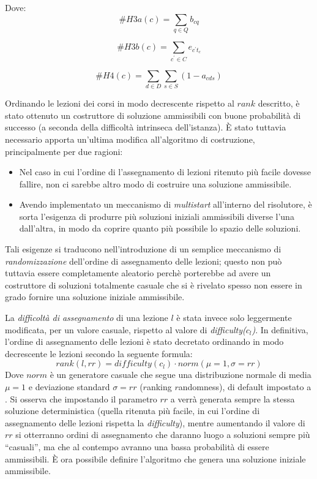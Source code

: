 \documentclass[]{article}
\newcommand{\q}[1]{``#1''}
\newcommand{\E}{È }
\begin{document}
Dove:
\[\#{H3a}(c) = \sum_{q \in Q} b_{cq}\]
\begin{center}
\end{center}

\[\#{H3b}(c) = \sum_{c^\prime \in C} e_{c^\prime t_{c}}\]
\begin{center}
\end{center}

\[\#{H4}(c) = \sum_{d \in D} \sum_{s \in S} (1 -a_{cds})\]
\begin{center}
\end{center}

Ordinando le lezioni dei corsi in modo decrescente rispetto al $rank$ descritto, è stato ottenuto un costruttore di soluzione ammissibili con buone probabilità di successo (a seconda della difficoltà intrinseca dell'istanza).
\E stato tuttavia necessario apporta un'ultima modifica all'algoritmo di costruzione, principalmente per due ragioni:
\begin{itemize}
	\item Nel caso in cui l'ordine di l'assegnamento di lezioni ritenuto più facile dovesse fallire, non ci sarebbe altro modo di costruire una soluzione ammissibile.
	\item Avendo implementato un meccanismo di \textit{multistart} all'interno del risolutore, è sorta l'esigenza di produrre più soluzioni iniziali ammissibili diverse l'una dall'altra, in modo da coprire quanto più possibile lo spazio delle soluzioni.
\end{itemize}
Tali esigenze si traducono nell'introduzione di un semplice meccanismo di \textit{randomizzazione} dell'ordine di assegnamento delle lezioni; questo non può tuttavia essere completamente aleatorio  perchè porterebbe ad avere un costruttore di soluzioni totalmente casuale che si è rivelato spesso non essere in grado fornire una soluzione iniziale ammissibile.

La \textit{difficoltà di assegnamento} di una lezione $l$ è stata invece solo leggermente modificata, per un valore casuale, rispetto al valore di \textit{difficulty($c_l$)}.
In definitiva, l'ordine di assegnamento delle lezioni è stato decretato ordinando in modo decrescente le lezioni secondo la seguente formula:
\[ \mathit{rank}(l,rr) = \mathit{difficulty}(c_l) \cdot \mathit{norm}(\mu=1, \sigma=rr) \]
Dove $norm$ è un generatore casuale che segue una distribuzione normale di media $\mu=1$ e deviazione standard $\sigma=rr$ ($r$anking $r$andomness), di default impostato a .
Si osserva che impostando il parametro $rr$ a  verrà generata sempre la stessa soluzione deterministica (quella ritenuta più facile, in cui l'ordine di assegnamento delle lezioni rispetta la \textit{difficulty}), mentre aumentando il valore di $rr$ si otterranno ordini di assegnamento che daranno luogo a soluzioni sempre più \q{casuali}, ma che al contempo avranno una bassa probabilità di essere ammissibili. \E ora possibile definire l'algoritmo che genera una soluzione iniziale ammissibile.
\end{document}
